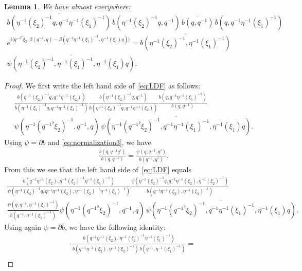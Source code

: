 \documentclass[a4paper,11pt,reqno]{amsart}
\numberwithin{equation}{section}
\newtheorem{lemma}[theorem]{Lemma}
\theoremstyle{remark}
\theoremstyle{definition}
\begin{document}
\begin{lemma}
\label{LDF}
We have almost everywhere:
\begin{multline}\label{eq:LDF}
 \overline{b (\eta^{-1}(\xi_2)^{-1}q,q^{-1}\eta^{-1}(\xi_1)^{-1})}\,b (\eta^{-1}(\xi_2)^{-1}q,q^{-1})\, \overline{b (q,q^{-1})}\,b (q,q^{-1}\eta^{-1}(\xi_1)^{-1})\\
 e^{i\langle {q^{-1}}^\flat\xi_2,\beta(q^{-1},q)-\beta(q^{-1}\eta^{-1}(\xi_1)^{-1},\eta^{-1}(\xi_1)q)\rangle}
 =\overline {b(\eta^{-1}(\xi_2)^{-1},\eta^{-1}(\xi_1)^{-1})}\\ \overline{\psi(\eta^{-1}(\xi_2)^{-1},\eta^{-1}(\xi_1)^{-1},\eta^{-1}(\xi_1)q)}.
 \end{multline}
\end{lemma}
\begin{proof}
We first write the left hand side of~\eqref{eq:LDF} as follows:
\begin{multline*}
\frac{b (\eta^{-1}(\xi_2)^{-1}q, q^{-1}\eta^{-1}(\xi_2))}{b (\eta^{-1}(\xi_2)^{-1}q,q^{-1}\eta^{-1}(\xi_1)^{-1})}
\frac{b (\eta^{-1}(\xi_2)^{-1}q,q^{-1})}{b (\eta^{-1}(\xi_2)^{-1}q, q^{-1}\eta^{-1}(\xi_2))}
\frac{b (q,q^{-1}\eta^{-1}(\xi_1)^{-1})}{b(q,q^{-1})}\\
\psi(\eta^{-1}({q^{-1}}^\flat\xi_2)^{-1},q^{-1},q)\,
\overline  {\psi(\eta^{-1}({q^{-1}}^\flat\xi_2)^{-1},q^{-1}\eta^{-1}(\xi_1)^{-1},\eta^{-1}(\xi_1)q)}.
\end{multline*}
Using $\psi=\partial b$ and \eqref{eq:normalization3}, we have
\begin{align}
\label{ID}
\frac{b(q,q^{-1}q')}{b(q,q^{-1})}=\frac{\psi(q,q^{-1},q')}{b(q^{-1},q')}.
\end{align}
From this we see that the left hand side of~\eqref{eq:LDF} equals
\begin{multline*}
\frac{b(q^{-1}\eta^{-1}(\xi_2),\eta^{-1}(\xi_2)^{-1}\eta^{-1}(\xi_1)^{-1})}{\psi(\eta^{-1}(\xi_2)^{-1}q,q^{-1}\eta^{-1}(\xi_2),\eta^{-1}(\xi_2)^{-1}\eta^{-1}(\xi_1)^{-1})}
\frac{\psi(\eta^{-1}(\xi_2)^{-1}q,q^{-1}\eta^{-1}(\xi_2),\eta^{-1}(\xi_2)^{-1})}{ b(q^{-1}\eta^{-1}(\xi_2),\eta^{-1}(\xi_2)^{-1})}\\
\frac{\psi(q,q^{-1},\eta^{-1}(\xi_1)^{-1})}{ b (q^{-1},\eta^{-1}(\xi_1)^{-1})} \psi(\eta^{-1}({q^{-1}}^\flat\xi_2)^{-1},q^{-1},q)\,
\overline  {\psi(\eta^{-1}({q^{-1}}^\flat\xi_2)^{-1},q^{-1}\eta^{-1}(\xi_1)^{-1},\eta^{-1}(\xi_1)q)}.
\end{multline*}
Using again $\psi=\partial b$, we have the following identity:
\begin{multline*}
\frac{b(q^{-1}\eta^{-1}(\xi_2),\eta^{-1}(\xi_2)^{-1}\eta^{-1}(\xi_1)^{-1})}{ b(q^{-1}\eta^{-1}(\xi_2),\eta^{-1}(\xi_2)^{-1})\,b (q^{-1},\eta^{-1}(\xi_1)^{-1})}=\\

\end{multline*}
\end{proof}
\end{document}
